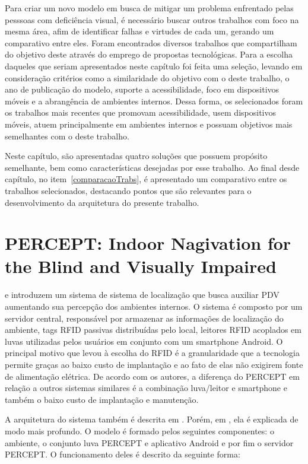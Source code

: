 \documentclass[english,brazilian]{UNISINOSmonografia}
\begin{document}
Para criar um novo modelo em busca de mitigar um problema enfrentado pelas pesssoas com deficiência visual, é necessário buscar outros trabalhos com foco na mesma área, afim de identificar falhas e virtudes de cada um, gerando um comparativo entre eles. Foram encontrados diversos trabalhos que compartilham do objetivo deste através do emprego de propostas tecnológicas. Para a escolha daqueles que seriam apresentados neste capítulo foi feita uma seleção, levando em consideração critérios como a similaridade do objetivo com o deste trabalho, o ano de publicação do modelo, suporte a acessibilidade, foco em dispositivos móveis e a abrangência de ambientes internos. Dessa forma, os selecionados foram os trabalhos mais recentes que promovam acessibilidade, usem dispositivos móveis, atuem principalmente em ambientes internos e possuam objetivos mais semelhantes com o deste trabalho.

Neste capítulo, são apresentadas quatro soluções que possuem propósito semelhante, bem como características desejadas por esse trabalho. Ao final desde capítulo, no item~\ref{comparacaoTrabs}, é apresentado um comparativo entre os trabalhos selecionados, destacando pontos que são relevantes para o desenvolvimento da arquitetura do presente trabalho.

	\section{PERCEPT: Indoor Nagivation for the Blind and Visually Impaired} 
 e  introduzem um sistema de sistema de localização que busca auxiliar PDV aumentando sua percepção dos ambientes internos. O sistema é composto por um servidor central, responsável por armazenar as informações de localização do ambiente, tags RFID passivas distribuídas pelo local, leitores RFID acoplados em luvas utilizadas pelos usuários em conjunto com um smartphone Android. O principal motivo que levou à escolha do RFID é a granularidade que a tecnologia permite graças ao baixo custo de implantação e ao fato de elas não exigirem fonte de alimentação elétrica. De acordo com os autores, a diferença do PERCEPT em relação a outros sistemas similares é a combinação luva/leitor e smartphone e também o baixo custo de implantação e manutenção. 

A arquitetura do sistema também é descrita em . Porém, em , ela é explicada de modo mais profundo. O modelo é formado pelos seguintes componentes: o ambiente, o conjunto luva PERCEPT e aplicativo Android e por fim o servidor PERCEPT. O funcionamento deles é descrito da seguinte forma:
\end{document}
